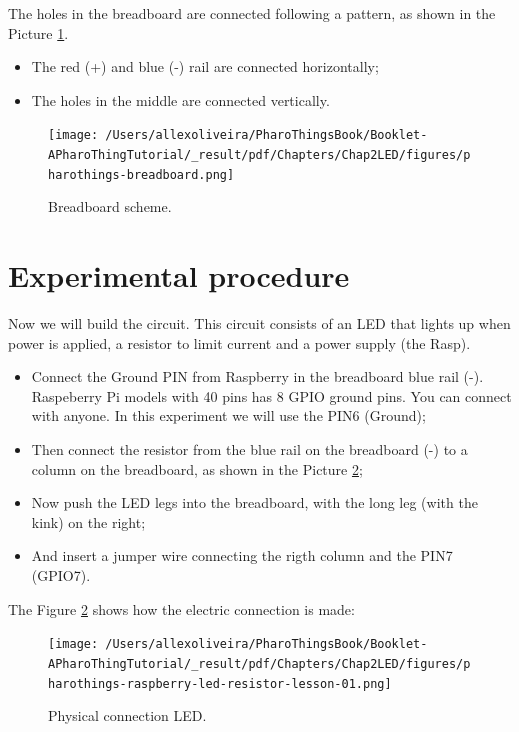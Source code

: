 \documentclass[10pt,twoside,english]{_support/latex/sbabook/sbabook}
\begin{document}
The holes in the breadboard are connected following a pattern, as shown in the Picture \ref{Breadboard}.

\begin{itemize}
\item The red (+) and blue (-) rail are connected horizontally;
\item The holes in the middle are connected vertically.
\end{itemize}


\begin{figure}

\begin{center}
\texttt{[image: /Users/allexoliveira/PharoThingsBook/Booklet-APharoThingTutorial/\_result/pdf/Chapters/Chap2LED/figures/pharothings-breadboard.png]}\caption{Breadboard scheme.\label{Breadboard}}\end{center}
\end{figure}

\section{Experimental procedure}
Now we will build the circuit. This circuit consists of an LED that lights up when power is applied, a resistor to limit current and a power supply (the Rasp).

\begin{itemize}
\item Connect the Ground PIN from Raspberry in the breadboard blue rail (-). Raspeberry Pi models with 40 pins has 8 GPIO ground pins. You can connect with anyone. In this experiment we will use the PIN6 (Ground);
\item Then connect the resistor from the blue rail on the breadboard (-) to a column on the breadboard, as shown in the Picture \ref{physicalLed};
\item Now push the LED legs into the breadboard, with the long leg (with the kink) on the right;
\item And insert a jumper wire connecting the rigth column and the PIN7 (GPIO7).
\end{itemize}

The Figure \ref{physicalLed} shows how the electric connection is made:


\begin{figure}

\begin{center}
\texttt{[image: /Users/allexoliveira/PharoThingsBook/Booklet-APharoThingTutorial/\_result/pdf/Chapters/Chap2LED/figures/pharothings-raspberry-led-resistor-lesson-01.png]}\caption{Physical connection LED.\label{physicalLed}}\end{center}
\end{figure}
\end{document}
